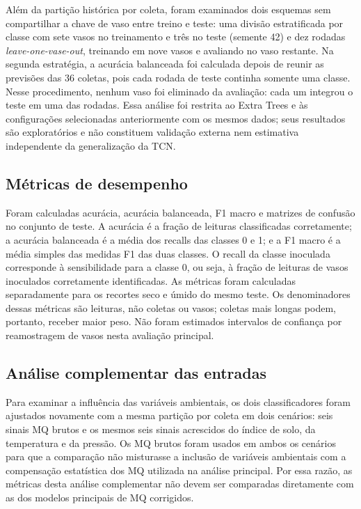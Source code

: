 Além da partição histórica por coleta, foram examinados dois esquemas sem
compartilhar a chave de vaso entre treino e teste: uma divisão estratificada
por classe com sete vasos no treinamento e três no teste (semente 42) e dez
rodadas \textit{leave-one-vase-out}, treinando em nove vasos e avaliando no
vaso restante. Na segunda estratégia, a acurácia balanceada foi calculada
depois de reunir as previsões das 36 coletas, pois cada rodada de teste
continha somente uma classe. Nesse procedimento, nenhum vaso foi eliminado
da avaliação: cada um integrou o teste em uma das rodadas. Essa análise foi
restrita ao Extra Trees e
às configurações selecionadas anteriormente com os mesmos dados; seus
resultados são exploratórios e não constituem validação externa nem
estimativa independente da generalização da TCN.

\subsection{Métricas de desempenho}
\label{subsec:metricas}

Foram calculadas acurácia, acurácia balanceada, F1 macro e matrizes de
confusão no conjunto de teste. A acurácia é a fração de leituras
classificadas corretamente; a acurácia balanceada é a média dos recalls
das classes 0 e 1; e a F1 macro é a média simples das medidas F1 das duas
classes. O recall da classe inoculada corresponde à sensibilidade
para a classe 0, ou seja, à fração de leituras de vasos inoculados
corretamente identificadas. As métricas foram calculadas separadamente
para os recortes seco e úmido do mesmo teste. Os denominadores dessas
métricas são leituras, não coletas ou vasos; coletas mais longas podem,
portanto, receber maior peso. Não foram estimados intervalos de confiança
por reamostragem de vasos nesta avaliação principal.

\subsection{Análise complementar das entradas}
\label{subsec:analise_entradas}

Para examinar a influência das variáveis ambientais, os dois classificadores
foram ajustados novamente com a mesma partição por coleta em dois cenários:
seis sinais MQ brutos e os mesmos seis sinais acrescidos do índice de solo,
da temperatura e da pressão. Os MQ brutos foram usados em ambos os cenários
para que a comparação não misturasse a inclusão de variáveis ambientais
com a compensação estatística dos MQ utilizada na análise principal. Por
essa razão, as métricas desta análise complementar não devem ser comparadas
diretamente com as dos modelos principais de MQ corrigidos.

